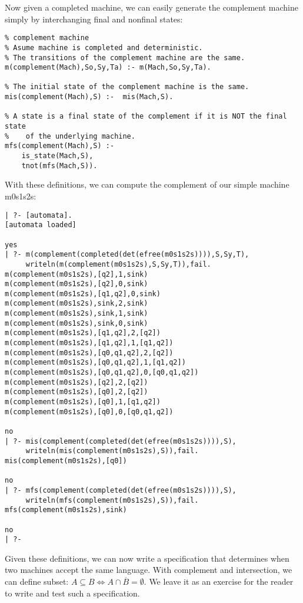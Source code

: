 Now given a completed machine, we can easily generate the complement
machine simply by interchanging final and nonfinal states:

\begin{verbatim}
% complement machine
% Asume machine is completed and deterministic.
% The transitions of the complement machine are the same.
m(complement(Mach),So,Sy,Ta) :- m(Mach,So,Sy,Ta).

% The initial state of the complement machine is the same.
mis(complement(Mach),S) :-  mis(Mach,S).

% A state is a final state of the complement if it is NOT the final state
%    of the underlying machine.
mfs(complement(Mach),S) :- 
    is_state(Mach,S),
    tnot(mfs(Mach,S)).
\end{verbatim}

With these definitions, we can compute the complement of our simple
machine m0s1s2s:
\begin{verbatim}
| ?- [automata].
[automata loaded]

yes
| ?- m(complement(completed(det(efree(m0s1s2s)))),S,Sy,T),
     writeln(m(complement(m0s1s2s),S,Sy,T)),fail.
m(complement(m0s1s2s),[q2],1,sink)
m(complement(m0s1s2s),[q2],0,sink)
m(complement(m0s1s2s),[q1,q2],0,sink)
m(complement(m0s1s2s),sink,2,sink)
m(complement(m0s1s2s),sink,1,sink)
m(complement(m0s1s2s),sink,0,sink)
m(complement(m0s1s2s),[q1,q2],2,[q2])
m(complement(m0s1s2s),[q1,q2],1,[q1,q2])
m(complement(m0s1s2s),[q0,q1,q2],2,[q2])
m(complement(m0s1s2s),[q0,q1,q2],1,[q1,q2])
m(complement(m0s1s2s),[q0,q1,q2],0,[q0,q1,q2])
m(complement(m0s1s2s),[q2],2,[q2])
m(complement(m0s1s2s),[q0],2,[q2])
m(complement(m0s1s2s),[q0],1,[q1,q2])
m(complement(m0s1s2s),[q0],0,[q0,q1,q2])

no
| ?- mis(complement(completed(det(efree(m0s1s2s)))),S),
     writeln(mis(complement(m0s1s2s),S)),fail.
mis(complement(m0s1s2s),[q0])

no
| ?- mfs(complement(completed(det(efree(m0s1s2s)))),S),
     writeln(mfs(complement(m0s1s2s),S)),fail.
mfs(complement(m0s1s2s),sink)

no
| ?- 
\end{verbatim}

Given these definitions, we can now write a specification that
determines when two machines accept the same language.  With
complement and intersection, we can define subset: $A \subseteq B \iff
A \cap \overline{B} = \emptyset$.  We leave it as an exercise for the
reader to write and test such a specification.

